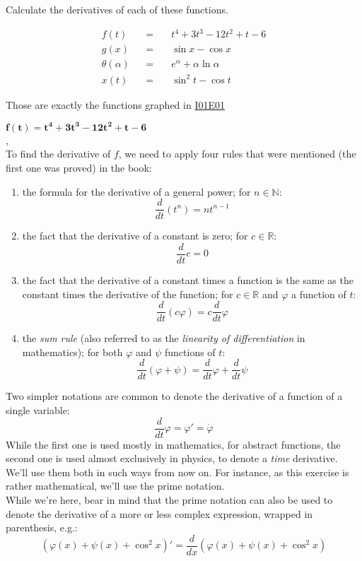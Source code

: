 \documentclass[solutions.tex]{subfiles}
\begin{document}
\maketitle
\begin{exercise}
Calculate the derivatives of each of these functions.

\begin{equation*} \begin{aligned}
	f(t) &&=\quad& t^4 + 3t^3 - 12t^2 + t - 6 \\
	g(x) &&=\quad& \sin x - \cos x \\
	\theta(\alpha) &&=\quad& e^\alpha + \alpha\ln\alpha \\
	x(t) &&=\quad& \sin^2t - \cos t
\end{aligned} \end{equation*}
\end{exercise}
\begin{remark} Those are exactly the functions graphed in
\href{https://github.com/mbivert/ttm/blob/master/cm/I01E01.pdf}{I01E01}
\end{remark}
\hr
$\bm{f(t) = t^4 + 3t^3 - 12t^2 + t - 6}$ \\, \\
To find the derivative of $f$, we need to apply four rules that
were mentioned (the first one was proved) in the book:
\begin{enumerate}
	\item the formula for the derivative of a general power;
	for $n\in\mathbb{N}$:
	\[
		\frac{d}{dt}(t^n) = n t^{n-1}
	\]
	\item the fact that the derivative of a constant is zero;
	for $c\in\mathbb{R}$:
	\[
		\frac{d}{dt}c = 0
	\]
	\item the fact that the derivative of a constant times
	a function is the same as the constant times the derivative
	of the function; for $c\in\mathbb{R}$ and $\varphi$ a function
	of $t$:
	\[
		\frac{d}{dt}(c\varphi) = c\frac{d}{dt}\varphi
	\]
	\item the \textit{sum rule} (also referred to as the
	\textit{linearity of differentiation} in mathematics); for
	both $\varphi$ and $\psi$ functions of $t$:
	\[
		\frac{d}{dt}(\varphi+\psi) = \frac{d}{dt}\varphi+\frac{d}{dt}\psi
	\]
\end{enumerate}
\begin{remark} Two simpler notations are common to denote the derivative
of a function of a single variable:
\[
	\frac{d}{dt}\varphi = \varphi' = \dot\varphi
\]
While the first one is used mostly in mathematics, for abstract functions,
the second one is used almost exclusively in physics, to denote
a \textit{time} derivative. We'll use them both in such ways from
now on. For instance, as this exercise is rather mathematical, we'll
use the prime notation. \\

While we're here, bear in mind that the prime notation can also be used
to denote the derivative of a more or less complex expression, wrapped
in parenthesis, e.g.:
\[
	(\varphi(x)+\psi(x)+\cos^2 x)' = \frac{d}{dx}(\varphi(x)+\psi(x)+\cos^2 x)
\]
\end{remark}
\end{document}
